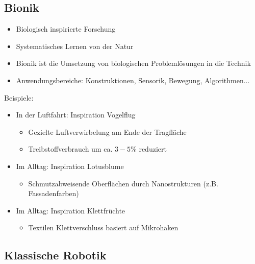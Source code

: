 \subsection{Bionik}

\begin{itemize}
	\item Biologisch inspirierte Forschung
	\item Systematisches Lernen von der Natur
	\item Bionik ist die Umsetzung von biologischen Problemlösungen in die Technik
	\item Anwendungsbereiche: Konstruktionen, Sensorik, Bewegung, Algorithmen...
\end{itemize}

Beispiele:
\begin{itemize}
	\item In der Luftfahrt: Inspiration Vogelflug
	\begin{itemize}
		\item Gezielte Luftverwirbelung am Ende der Tragfläche
		\item Treibstoffverbrauch um ca. $3-5\%$ reduziert
	\end{itemize}
	\item Im Alltag: Inspiration Lotusblume
	\begin{itemize}
		\item Schmutzabweisende Oberflächen durch Nanostrukturen (z.B. Fassadenfarben)
	\end{itemize}
	\item Im Alltag: Inspiration Klettfrüchte
	\begin{itemize}
		\item Textilen Klettverschluss basiert auf Mikrohaken
	\end{itemize}	
\end{itemize}

\subsection{Klassische Robotik}


